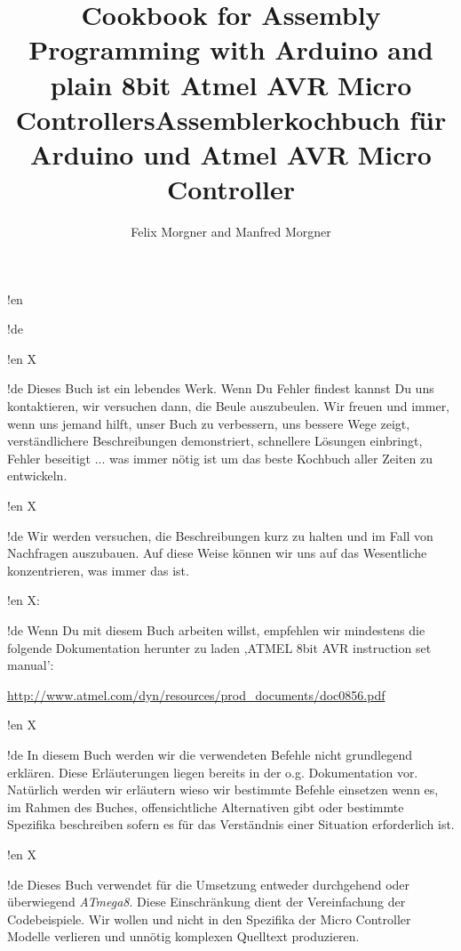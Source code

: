 \documentclass[twoside,12pt,authoryear,openright]{book}
\newcommand{\at}{\textit{ATmega8}}
\begin{document}

!en \title{Cookbook for Assembly Programming with Arduino and plain 8bit Atmel AVR Micro Controllers}
!de \title{Assemblerkochbuch für Arduino und Atmel AVR Micro Controller}

\author{Felix Morgner and Manfred Morgner}


\maketitle

!en X

!de Dieses Buch ist ein lebendes Werk. Wenn Du Fehler findest kannst Du uns kontaktieren, wir versuchen dann, die Beule auszubeulen. Wir freuen und immer, wenn uns jemand hilft, unser Buch zu verbessern, uns bessere Wege zeigt, verständlichere Beschreibungen demonstriert, schnellere Lösungen einbringt, Fehler beseitigt ... was immer nötig ist um das beste Kochbuch aller Zeiten zu entwickeln.


!en X

!de Wir werden versuchen, die Beschreibungen kurz zu halten und im Fall von Nachfragen auszubauen. Auf diese Weise können wir uns auf das Wesentliche konzentrieren, was immer das ist.



!en X:

!de Wenn Du mit diesem Buch arbeiten willst, empfehlen wir mindestens die folgende Dokumentation herunter zu laden ,ATMEL 8bit AVR instruction set manual':

\url{http://www.atmel.com/dyn/resources/prod_documents/doc0856.pdf}



!en X

!de In diesem Buch werden wir die verwendeten Befehle nicht grundlegend erklären. Diese Erläuterungen liegen bereits in der o.g. Dokumentation vor. Natürlich werden wir erläutern wieso wir bestimmte Befehle einsetzen wenn es, im Rahmen des Buches, offensichtliche Alternativen gibt oder bestimmte Spezifika beschreiben sofern es für das Verständnis einer Situation erforderlich ist.



!en X

!de Dieses Buch verwendet für die Umsetzung entweder durchgehend oder überwiegend \at. Diese Einschränkung dient der Vereinfachung der Codebeispiele. Wir wollen und nicht in den Spezifika der Micro Controller Modelle verlieren und unnötig komplexen Quelltext produzieren.
\end{document}
